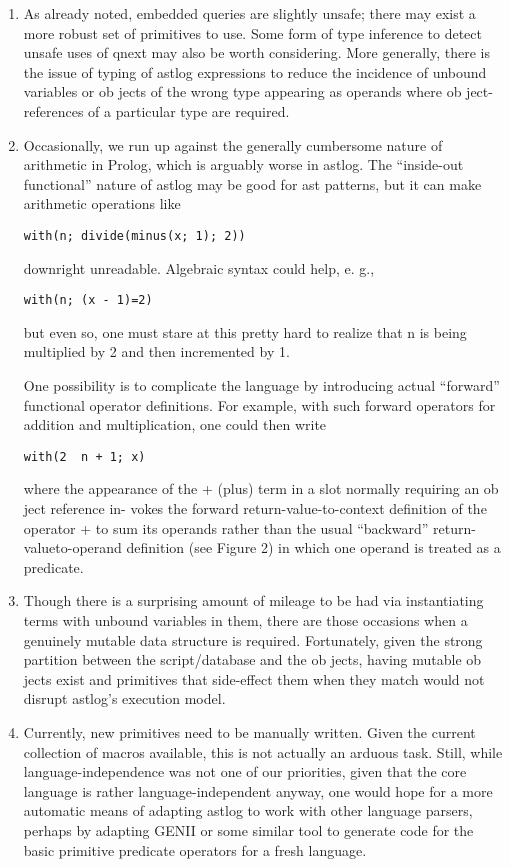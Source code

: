 \begin{enumerate}
  \item 
As already noted, embedded queries are slightly
unsafe; there may exist a more robust set of primitives
to use. Some form of type inference to detect
unsafe uses of qnext may also be worth considering.
More generally, there is the issue of typing
of astlog expressions to reduce the incidence of
unbound variables or ob jects of the wrong type
appearing as operands where ob ject-references of
a particular type are required.

\item
Occasionally, we run up against the generally
cumbersome nature of arithmetic in Prolog, which
is arguably worse in astlog. The ``inside-out
functional'' nature of astlog may be good for
ast patterns, but it can make arithmetic operations
like
\begin{verbatim}
with(n; divide(minus(x; 1); 2))
\end{verbatim}
downright unreadable. Algebraic syntax could help, e. g.,
\begin{verbatim}
with(n; (x - 1)=2) 
\end{verbatim}
but even so, one must stare at this pretty hard to
realize that n is being multiplied by 2 and then
incremented by 1.

One possibility is to complicate the language by
introducing actual ``forward'' functional operator
definitions. For example, with such forward operators
for addition and multiplication, one could
then write
\begin{verbatim}
with(2  n + 1; x)
\end{verbatim}
where the appearance of the + (plus) term in
a slot normally requiring an ob ject reference in- vokes the forward
return-value-to-context definition of the operator + to sum its operands
rather than the usual ``backward'' return-valueto-operand
definition (see Figure 2) in which one
operand is treated as a predicate.

\item
Though there is a surprising amount of mileage to
be had via instantiating terms with unbound variables
in them, there are those occasions when a
genuinely mutable data structure is required. Fortunately,
given the strong partition between the
script/database and the ob jects, having mutable
ob jects exist and primitives that side-effect them
when they match would not disrupt astlog's execution
model.

\item
Currently, new primitives need to be manually
written. Given the current collection of macros
available, this is not actually an arduous task.
Still, while language-independence was not one
of our priorities, given that the core language is
rather language-independent anyway, one would
hope for a more automatic means of adapting
astlog to work with other language parsers, perhaps
by adapting GENII \cite{Dev92} or some similar
tool to generate code for the basic primitive predicate
operators for a fresh language.
 
\end{enumerate}


